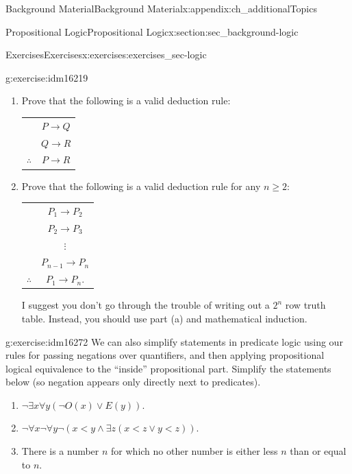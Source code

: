 \documentclass[oneside,10pt,]{book}
\numberwithin{equation}{chapter}
\newcommand{\hrulethin}  {\noalign{\hrule height 0.04em}}
\def\imp{\rightarrow}
\newcommand{\lt}{<}
\begin{document}
\begin{appendixptx}{Background Material}{}{Background Material}{}{}{x:appendix:ch_additionalTopics}
\begin{sectionptx}{Propositional Logic}{}{Propositional Logic}{}{}{x:section:sec_background-logic}
\begin{exercises-subsection}{Exercises}{}{Exercises}{}{}{x:exercises:exercises_sec-logic}
\begin{divisionexercise}{13}{}{}{g:exercise:idm16219}
%
\begin{enumerate}[label=(\alph*)]
\item{}Prove that the following is a valid deduction rule:%
\begin{sidebyside}{1}{0}{0}{0}%
\begin{sbspanel}{1}%
{\centering%
\begin{tabular}{cc}
&\(P \imp Q\)\tabularnewline[0pt]
&\(Q \imp R\)\tabularnewline\hrulethin
\(\therefore\)&\(P \imp R\)
\end{tabular}
\par}
\end{sbspanel}%
\end{sidebyside}%
\item{}Prove that the following is a valid deduction rule for any \(n \ge 2\):%
\begin{sidebyside}{1}{0}{0}{0}%
\begin{sbspanel}{1}%
{\centering%
\begin{tabular}{cc}
&\(P_1 \imp P_2\)\tabularnewline[0pt]
&\(P_2 \imp P_3\)\tabularnewline[0pt]
&\(\vdots\)\tabularnewline[0pt]
&\(P_{n-1} \imp P_n\)\tabularnewline\hrulethin
\(\therefore\)&\(P_1 \imp P_n\).
\end{tabular}
\par}
\end{sbspanel}%
\end{sidebyside}%
\par
I suggest you don't go through the trouble of writing out a \(2^n\) row truth table. Instead, you should use part (a) and mathematical induction. %
\end{enumerate}
%
\end{divisionexercise}%
\begin{divisionexercise}{14}{}{}{g:exercise:idm16272}%
We can also simplify statements in predicate logic using our rules for passing negations over quantifiers, and then applying propositional logical equivalence to the ``inside'' propositional part.  Simplify the statements below (so negation appears only directly next to predicates).%
\par
%
\begin{enumerate}[label=(\alph*)]
\item{}\(\neg \exists x \forall y (\neg O(x) \vee E(y))\).%
\item{}\(\neg \forall x \neg \forall y \neg(x \lt  y \wedge \exists z (x \lt  z \vee y \lt  z))\).%
\item{}There is a number \(n\) for which no other number is either less \(n\) than or equal to \(n\).%

\end{enumerate}
\end{divisionexercise}
\end{exercises-subsection}
\end{sectionptx}
\end{appendixptx}
\end{document}
